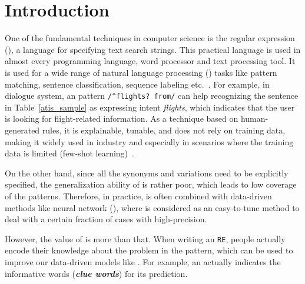 \section{Introduction}




One of the fundamental techniques in computer science is the regular expression (\RE), a language for specifying text search strings. This
practical language is used in almost every programming language, word processor and text processing tool. It is used for a wide range of
natural language processing (\NLP) tasks like pattern matching, sentence classification, sequence labeling
etc.~\cite{chang2014tokensregex}. For example, in dialogue system, an \RE pattern \texttt{/\textasciicircum flights? from/} can help
recognizing the sentence in Table~\ref{atis_sample} as expressing intent \emph{flights}, which indicates that the user is looking for
flight-related information. As a technique based on human-generated rules, it is explainable, tunable, and does not rely on training data,
making it widely used in industry and especially in scenarios where the training data is limited (few-shot learning)~\cite{gc2015big}.

On the other hand, since all the synonyms and variations need to be explicitly specified, the generalization ability of \RE is rather poor,
which leads to low coverage of the patterns. Therefore, in practice, \RE is often combined with data-driven methods like neural network
(\NN), where \RE is considered as an easy-to-tune method to deal with a certain fraction of cases with high-precision.

However, the value of \RE is more than that. When writing an \texttt{RE}, people actually encode their knowledge about the problem in the
pattern, which can be used to improve our data-driven models like \NN. For example, an \RE actually indicates the informative words
(\textbf{\emph{clue words}}) for its prediction.

